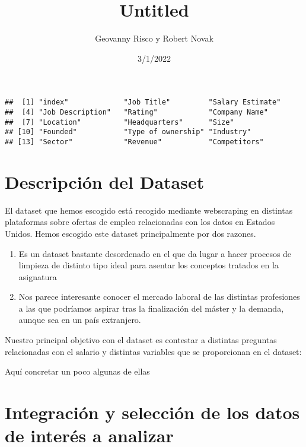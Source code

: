 \documentclass[
]{article}
\title{Untitled}
\author{Geovanny Risco y Robert Novak}
\date{3/1/2022}
\begin{document}
\maketitle

\begin{verbatim}
##  [1] "index"             "Job Title"         "Salary Estimate"  
##  [4] "Job Description"   "Rating"            "Company Name"     
##  [7] "Location"          "Headquarters"      "Size"             
## [10] "Founded"           "Type of ownership" "Industry"         
## [13] "Sector"            "Revenue"           "Competitors"
\end{verbatim}

\hypertarget{descripciuxf3n-del-dataset}{%
\section{Descripción del Dataset}\label{descripciuxf3n-del-dataset}}

El dataset que hemos escogido está recogido mediante webscraping en
distintas plataformas sobre ofertas de empleo relacionadas con los datos
en Estados Unidos. Hemos escogido este dataset principalmente por dos
razones.

\begin{enumerate}
\def\labelenumi{\arabic{enumi}.}
\item
  Es un dataset bastante desordenado en el que da lugar a hacer procesos
  de limpieza de distinto tipo ideal para asentar los conceptos tratados
  en la asignatura
\item
  Nos parece interesante conocer el mercado laboral de las distintas
  profesiones a las que podríamos aspirar tras la finalización del
  máster y la demanda, aunque sea en un país extranjero.
\end{enumerate}

Nuestro principal objetivo con el dataset es contestar a distintas
preguntas relacionadas con el salario y distintas variables que se
proporcionan en el dataset:

Aquí concretar un poco algunas de ellas

\hypertarget{integraciuxf3n-y-selecciuxf3n-de-los-datos-de-interuxe9s-a-analizar}{%
\section{Integración y selección de los datos de interés a
analizar}\label{integraciuxf3n-y-selecciuxf3n-de-los-datos-de-interuxe9s-a-analizar}}
\end{document}
